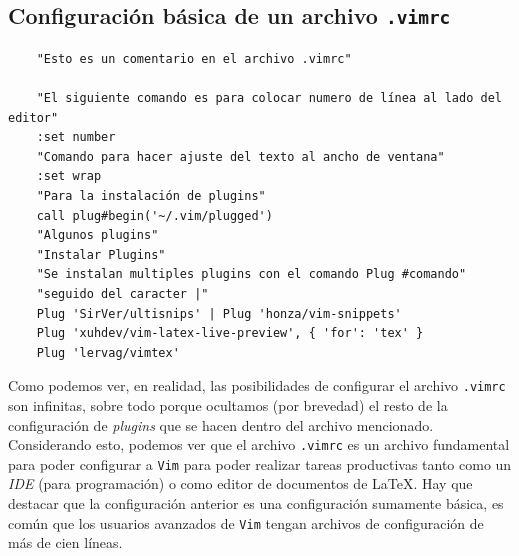 \documentclass[10pt]{article}
\begin{document}
\subsection{Configuración básica de un archivo \texttt{.vimrc}}
\begin{verbatim}
	"Esto es un comentario en el archivo .vimrc"

	"El siguiente comando es para colocar numero de línea al lado del editor"
	:set number 
	"Comando para hacer ajuste del texto al ancho de ventana"
	:set wrap
	"Para la instalación de plugins"
	call plug#begin('~/.vim/plugged')
	"Algunos plugins"
	"Instalar Plugins"
	"Se instalan multiples plugins con el comando Plug #comando"
	"seguido del caracter |"
	Plug 'SirVer/ultisnips' | Plug 'honza/vim-snippets'
	Plug 'xuhdev/vim-latex-live-preview', { 'for': 'tex' }
	Plug 'lervag/vimtex'
\end{verbatim}
Como podemos ver, en realidad, las posibilidades de configurar el archivo \texttt{.vimrc} son infinitas, sobre todo porque ocultamos (por brevedad) el resto de la configuración de \textit{plugins} que se hacen dentro del archivo mencionado.
Considerando esto, podemos ver que el archivo \texttt{.vimrc} es un archivo fundamental para poder configurar a \texttt{Vim} para poder realizar tareas productivas tanto como un \textit{IDE} (para programación) o como editor de documentos de \LaTeX.
Hay que destacar que la configuración anterior es una configuración sumamente básica, es común que los usuarios avanzados de \texttt{Vim} tengan archivos de configuración de más de cien líneas. 
\end{document}
